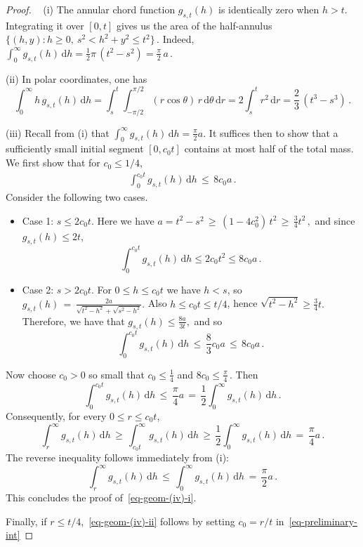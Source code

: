 \documentclass[ECP,preprint]{ejpecp} %
\newcommand{\1}{\mathbf 1}
\renewcommand{\d}{\mathrm d}
\begin{document}
\begin{proof}~ (i) The annular chord function $g_{s,t}(h)$ is identically zero when $h > t$. Integrating it over $[0,t]$ gives us the area of the half-annulus
\(
    \{(h,y): h\ge0, \ s^2<h^2+y^2 \le t^2\} \, .
\)
Indeed,
\(
    \int_0^\infty g_{s,t}(h)\, \d h
    =
    \frac12\pi \, (t^2-s^2)
    =
    \frac{\pi}{2} \, a \, .
\)

\medskip 

\noindent (ii) In polar coordinates, one has
\[
    \int_0^\infty h\,g_{s,t}(h)\, \d h
    =
    \int_s^t
    \int_{-\pi/2}^{\pi/2}
    (r\cos\theta) \, r\, \d \theta\, \d r
    =
    2\int_s^t r^2\, \d r
    =
    \frac23 \, (t^3-s^3) \, .
\]

\medskip 

\noindent (iii) Recall from (i) that
\(
    \int_0^\infty g_{s,t}(h)\,\d h
    =
    \frac{\pi}{2}a.
\)
It suffices then to show that a sufficiently small initial segment \([0,c_0t]\) contains at most half of the total mass. We first show that for \(c_0\le 1/4\),
\begin{align} \label{eq-preliminary-int}
    \int_0^{c_0t} g_{s,t}(h)\, \d h
    \, \le \,  8 c_0 a \, .
\end{align}
Consider the following two cases.
\begin{itemize}
    \item Case 1: \( s \le 2 c_0 t\). Here we have
    \(
        a=t^2-s^2 
        \, \ge \,  
        (1-4c_0^2) \, t^2 
        \, \ge \, 
        \frac34 t^2 \, ,
    \)
    and since \(g_{s,t}(h)\le 2t\),
    \[
        \int_0^{c_0t}g_{s,t}(h)\,\d h
        \le 2c_0t^2
        \le 8c_0a \, .
    \]
    \item Case 2: \( s > 2c_0 t \). For \(0\le h\le c_0t\) we have \(h<s\), so
    \(
        g_{s,t}(h)
        \, = \, 
        \frac{2a}{
            \sqrt{t^2-h^2}+\sqrt{s^2-h^2}
        }.
    \)
    Also \(h\le c_0t\le t/4\), hence
    \(
        \sqrt{t^2-h^2}\ge \frac34t.
    \)
    Therefore, we have that
    \(
        g_{s,t}(h)\le \frac{8a}{3t},
    \)
    and so
    \[
        \int_0^{c_0t}g_{s,t}(h)\,\d h
        \, \le \,  \frac83 c_0a
        \, \le \,  8c_0a \, .
    \]
\end{itemize}
%
Now choose \(c_0>0\) so small that
\(
    c_0\le \frac14
\)
and
\(
    8c_0\le \frac{\pi}{4} \, .
\)
Then
\[
    \int_0^{c_0t}g_{s,t}(h)\,\d h
    \, \le \,
    \frac{\pi}{4}a
    \, = \,
    \frac12\int_0^\infty g_{s,t}(h)\,\d h \, . 
\]
Consequently, for every \(0\le r\le c_0t\),
\[
    \int_r^\infty g_{s,t}(h)\,\d h
    \, \ge \,
    \int_{c_0t}^\infty g_{s,t}(h)\,\d h
    \, \ge \,
    \frac12\int_0^\infty g_{s,t}(h)\,\d h
    \, = \,
    \frac{\pi}{4}a \, .
\]
The reverse inequality follows immediately from (i):
\[
    \int_r^\infty g_{s,t}(h)\,\d h
    \, \le \,
    \int_0^\infty g_{s,t}(h)\,\d h
    \, = \,
    \frac{\pi}{2}a \, .
\]
This concludes the proof of~\eqref{eq-geom-(iv)-i}.

Finally, if $r \leq t/4$,~\eqref{eq-geom-(iv)-ii} follows by setting $c_0 = r/t$ in~\eqref{eq-preliminary-int}
\end{proof}
\end{document}
